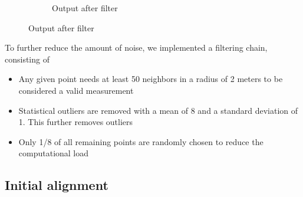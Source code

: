 \documentclass[10pt,twocolumn,letterpaper]{article}
\begin{document}
\begin{figure}
\begin{subfigure}{.5\linewidth}
  \caption{Output after filter}
  \label{fig:sfig2}
\end{subfigure}

\end{figure}


To further reduce the amount of noise, we implemented a filtering chain, consisting of 

\begin{itemize}
   \item Any given point needs at least 50 neighbors in a radius of 2 meters to be considered a valid measurement
   \item Statistical outliers are removed with a mean of 8 and a standard deviation of 1. This further removes outliers
   \item Only 1/8 of all remaining points are randomly chosen to reduce the computational load
\end{itemize}

\subsection{Initial alignment}
\end{document}
